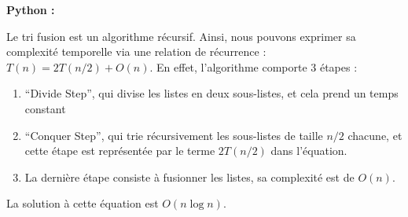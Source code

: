 \begin{Exercice} [30 minutes]
    \begin{solution}
        \textbf{Python :}
         
    \end{solution}
   
    \begin{solution}
        
        Le tri fusion est un algorithme récursif. Ainsi, nous pouvons exprimer sa complexité temporelle via une relation de récurrence : $T(n) = 2T(n/2) + O(n)$. En effet, l'algorithme comporte 3 étapes :
        \begin{enumerate}
            \item ``Divide Step'', qui divise les listes en deux sous-listes, et cela prend un temps constant
            \item ``Conquer Step'', qui trie récursivement les sous-listes de taille $n/2$ chacune, et cette étape est représentée par le terme $2T(n/2)$ dans l'équation.
            \item La dernière étape consiste à fusionner les listes, sa complexité est de $O(n)$.
        \end{enumerate}
        La solution à cette équation est $O(n \log n)$.
    \end{solution}
\end{Exercice}







